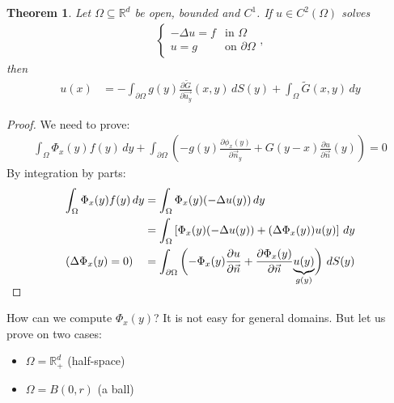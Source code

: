 \documentclass{report}
\theoremstyle{tommy}
\newtheorem{thm}[defn]{Theorem}
\begin{document}
  \begin{thm}
    Let \(\Omega \subseteq \mathbb{R}^d\) be open, bounded and \(C^1\). If \(u \in C^2(\Omega)\) solves 
    \begin{align*}
      \begin{cases}
        - \Delta u = f & \text{in } \Omega \\
        u = g & \text{on } \partial \Omega
      \end{cases},
    \end{align*}
    then 
    \begin{align*}
      u(x)
      &= - \int_{\partial \Omega} g(y) \frac{\partial \tilde G}{\partial \vec{u_y}}(x,y) \, dS(y) + \int_{\Omega} \tilde G(x,y) \, dy    \end{align*}
  \end{thm}

  \begin{proof}
    We need to prove: 
    \begin{align*}
      \int_\Omega \Phi_x(y) f(y) \, dy + \int_{\partial \Omega} \left(-g(y) \frac{\partial \phi_x(y)}{\partial \vec{n}_y} + G(y-x) \frac{\partial u}{\partial \vec{n}}(y)\right) = 0
    \end{align*}
    By integration by parts:
    \begin{align*}
      \int_\Omega \Phi_x(y) f(y) \, dy 
      &= \int_\Omega \Phi_x(y) (-\Delta u(y)) \, dy  \\
      &= \int_\Omega \left[\Phi_x(y) (-\Delta u(y)) + (\Delta \Phi_x(y)) u(y)\right] \, dy \\
      (\Delta \Phi_x(y) = 0) \quad &= \int_{\partial \Omega} \left(-\Phi_x(y) \frac{\partial u}{\partial \vec{n}} + \frac{\partial \Phi_x(y)}{\partial \vec{n}} \smash{\underbrace{u(y)}_{g(y)}}\right) \, dS(y) \qedhere
    \end{align*}
  \end{proof}
  How can we compute \(\Phi_x(y)\)? It is not easy for general domains. But let us prove on two cases:
  \begin{itemize}
    \item \(\Omega = \mathbb{R}_+^d\) (half-space)
    \item \(\Omega = B(0,r)\) (a ball)
  \end{itemize}
\end{document}
